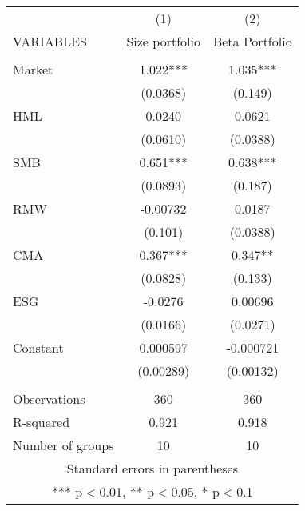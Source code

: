 \begin{tabular}{lcc} \hline
 & (1) & (2) \\
VARIABLES & Size portfolio & Beta Portfolio \\ \hline
 &  &  \\
Market & 1.022*** & 1.035*** \\
 & (0.0368) & (0.149) \\
HML & 0.0240 & 0.0621 \\
 & (0.0610) & (0.0388) \\
SMB & 0.651*** & 0.638*** \\
 & (0.0893) & (0.187) \\
RMW & -0.00732 & 0.0187 \\
 & (0.101) & (0.0388) \\
CMA & 0.367*** & 0.347** \\
 & (0.0828) & (0.133) \\
ESG & -0.0276 & 0.00696 \\
 & (0.0166) & (0.0271) \\
Constant & 0.000597 & -0.000721 \\
 & (0.00289) & (0.00132) \\
 &  &  \\
Observations & 360 & 360 \\
R-squared & 0.921 & 0.918 \\
 Number of groups & 10 & 10 \\ \hline
\multicolumn{3}{c}{ Standard errors in parentheses} \\
\multicolumn{3}{c}{ *** p$<$0.01, ** p$<$0.05, * p$<$0.1} \\
\end{tabular}
